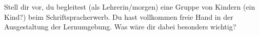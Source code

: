 Stell dir vor, du begleitest (als Lehrerin/morgen) eine Gruppe von Kindern (ein Kind?) beim Schriftspracherwerb.
Du hast vollkommen freie Hand in der Ausgestaltung der Lernumgebung.
Was wäre dir dabei besonders wichtig?